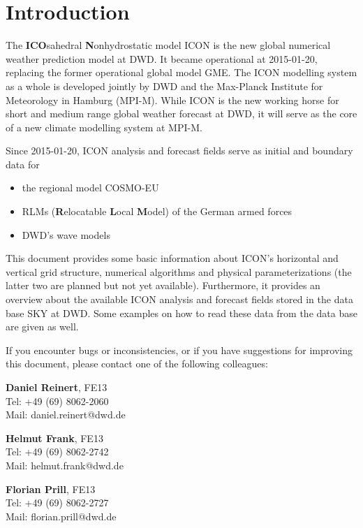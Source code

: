 \chapter{Introduction}

The \textbf{ICO}sahedral \textbf{N}onhydrostatic model ICON is the new global numerical 
weather prediction model at DWD. It became operational at 2015-01-20, replacing the former  
operational global model GME. The ICON modelling system as a whole is developed jointly by DWD and the 
Max-Planck Institute for Meteorology in Hamburg (MPI-M). While ICON is the new working horse 
for short and medium range global weather forecast at DWD, it will serve as the core of a new climate 
modelling system at MPI-M.

Since 2015-01-20, ICON analysis and forecast fields serve as initial and boundary data for
\begin{itemize}
 \item the regional model COSMO-EU
 \item RLMs (\textbf{R}elocatable \textbf{L}ocal \textbf{M}odel) of the German armed forces
 \item DWD's wave models
\end{itemize}

This document provides some basic information about ICON's horizontal and vertical grid structure, 
numerical algorithms and physical parameterizations (the latter two are planned but not yet available). 
Furthermore, it provides an overview about the available ICON analysis and forecast fields stored in the 
data base SKY at DWD. Some examples on how to read these data from the data base are given as well.

\newpage
If you encounter bugs or inconsistencies, or if you have suggestions for improving this document, 
please contact one of the following colleagues:

\begin{note}
\begin{minipage}{\textwidth}
\centering
\begin{minipage}{0.32\textwidth}
 \textbf{Daniel Reinert}, FE13 \\
 Tel: +49 (69) 8062-2060 \\ 
 Mail: daniel.reinert@dwd.de
\end{minipage}
\begin{minipage}{0.32\textwidth}
 \textbf{Helmut Frank}, FE13\\
 Tel: +49 (69) 8062-2742 \\ 
 Mail: helmut.frank@dwd.de
\end{minipage}
\begin{minipage}{0.32\textwidth}
 \textbf{Florian Prill}, FE13 \\
 Tel: +49 (69) 8062-2727 \\ 
 Mail: florian.prill@dwd.de
\end{minipage}
\end{minipage}
\end{note}  